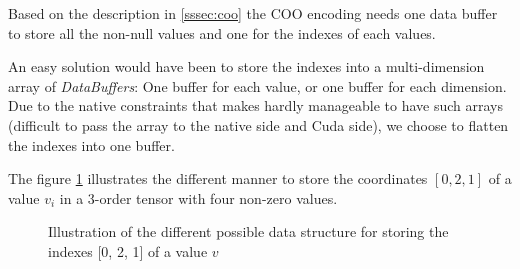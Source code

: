 Based on the description in \ref{sssec:coo} the COO encoding needs one data buffer to store all the non-null values and one for the indexes of each values. 

An easy solution would have been to store the indexes into a multi-dimension array of \textit{DataBuffers}: One buffer for each value, or one buffer for each dimension. Due to the native constraints that makes hardly manageable to have such arrays (difficult to pass the array to the native side and Cuda side), we choose to flatten the indexes into one buffer.

The figure \ref{fig:datastoring} illustrates the different manner to store the coordinates $[0, 2, 1]$ of a value $v_{i}$ in a 3-order tensor with four non-zero values.

\begin{figure}[h]
	\centering
	\quad
	\quad
	\hfill
	\caption{Illustration of the different possible data structure for storing the indexes  [0, 2, 1] of a value $v$ }
	\label{fig:datastoring}
\end{figure}


